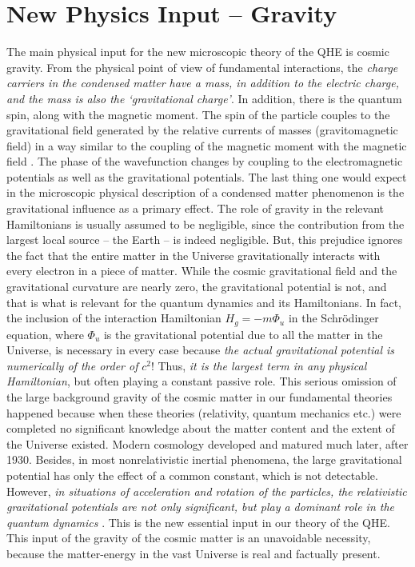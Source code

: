 \documentclass[aps,preprint,12pt,tightenlines]{revtex4}%
\begin{document}
\section{New Physics Input -- Gravity}

The main physical input for the new microscopic theory of the QHE is cosmic gravity.
From the physical point of view of fundamental interactions,
the \emph{charge carriers in the condensed matter have a mass, in addition to
the electric charge, and the mass is also the `gravitational charge'}. In
addition, there is the quantum spin, along with the magnetic moment. The spin
of the particle couples to the gravitational field generated by the relative
currents of masses (gravitomagnetic field) in a way similar to the coupling of
the magnetic moment with the magnetic field \cite{Wheeler-book}. The phase of
the wavefunction changes by coupling to the electromagnetic potentials as well
as the gravitational potentials. The last thing one would expect in the
microscopic physical description of a condensed matter phenomenon is the
gravitational influence as a primary effect. The role of gravity in the
relevant Hamiltonians is usually assumed to be negligible, since the
contribution from the largest local source -- the Earth -- is indeed
negligible. But, this prejudice ignores the fact that the entire matter in the
Universe gravitationally interacts with every electron in a piece of matter.
While the cosmic gravitational field and the gravitational curvature are
nearly zero, the gravitational potential is not, and that is what is relevant
for the quantum dynamics and its Hamiltonians. In fact, the inclusion of the
interaction Hamiltonian $H_{g}=-m\Phi_{u}$ in the Schr\"{o}dinger equation,
where $\Phi_{u}$ is the gravitational potential due to all the matter in the
Universe, is necessary in every case because \textit{the actual gravitational
potential is numerically of the order of }$c^{2}$! Thus, \textit{it is the
largest term in any physical Hamiltonian}, but often playing a constant
passive role. This serious omission of the large background gravity of the
cosmic matter in our fundamental theories happened because when these theories
(relativity, quantum mechanics etc.) were completed no significant knowledge
about the matter content and the extent of the Universe existed. Modern
cosmology developed and matured much later, after 1930. Besides, in most
nonrelativistic inertial phenomena, the large gravitational potential has only
the effect of a common constant, which is not detectable. However, \emph{in
situations of acceleration and rotation of the particles, the relativistic
gravitational potentials are not only significant, but play a dominant role in
the quantum dynamics} \cite{Unni-ISI,Unni-TPU}. This is the new essential
input in our theory of the QHE. This input of the gravity of the cosmic matter
is an unavoidable necessity, because the matter-energy in the vast Universe is
real and factually present.
\end{document}
